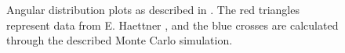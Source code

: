 \begin{figure}[!h]
{}
\label{fig:subfigureExample}
\caption[Optional caption for list of figures]{Angular distribution plots as described in \cite{AngularDistributionText}. The red triangles represent data from E. Haettner \cite{ehaettner}, and the blue crosses are calculated through the described Monte Carlo simulation.}
\end{figure}
\clearpage
